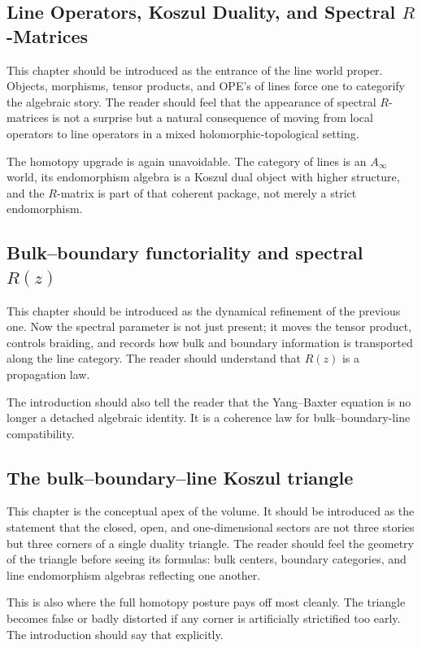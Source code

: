\subsection*{Line Operators, Koszul Duality, and Spectral $R$-Matrices}
This chapter should be introduced as the entrance of the line world proper.  Objects, morphisms, tensor products, and OPE's of lines force one to categorify the algebraic story.  The reader should feel that the appearance of spectral $R$-matrices is not a surprise but a natural consequence of moving from local operators to line operators in a mixed holomorphic-topological setting.

The homotopy upgrade is again unavoidable.  The category of lines is an $A_\infty$ world, its endomorphism algebra is a Koszul dual object with higher structure, and the $R$-matrix is part of that coherent package, not merely a strict endomorphism.

\subsection*{Bulk--boundary functoriality and spectral $R(z)$}
This chapter should be introduced as the dynamical refinement of the previous one.  Now the spectral parameter is not just present; it moves the tensor product, controls braiding, and records how bulk and boundary information is transported along the line category.  The reader should understand that $R(z)$ is a propagation law.

The introduction should also tell the reader that the Yang--Baxter equation is no longer a detached algebraic identity.  It is a coherence law for bulk--boundary-line compatibility.

\subsection*{The bulk--boundary--line Koszul triangle}
This chapter is the conceptual apex of the volume.  It should be introduced as the statement that the closed, open, and one-dimensional sectors are not three stories but three corners of a single duality triangle.  The reader should feel the geometry of the triangle before seeing its formulas: bulk centers, boundary categories, and line endomorphism algebras reflecting one another.

This is also where the full homotopy posture pays off most cleanly.  The triangle becomes false or badly distorted if any corner is artificially strictified too early.  The introduction should say that explicitly.

